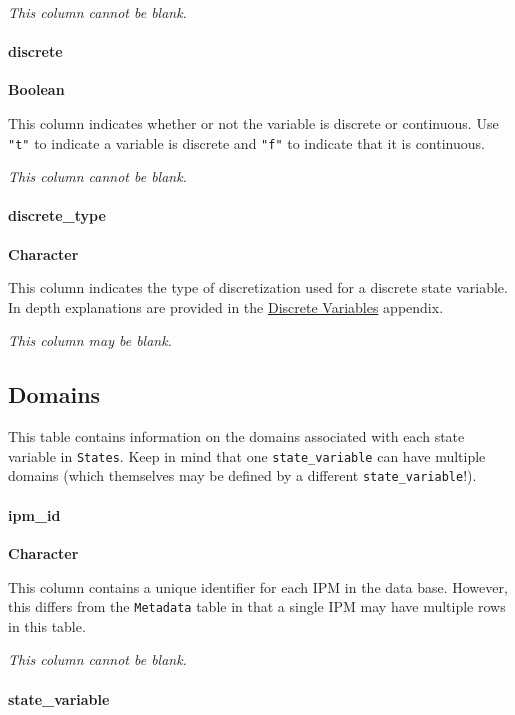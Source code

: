 \documentclass[]{article}
\let\oldparagraph\paragraph
\renewcommand{\paragraph}[1]{\oldparagraph{#1}\mbox{}}
\begin{document}
\emph{This column cannot be blank.}

\paragraph{discrete}\label{discrete}

\textbf{Boolean}

This column indicates whether or not the variable is discrete or
continuous. Use \texttt{"t"} to indicate a variable is discrete and
\texttt{"f"} to indicate that it is continuous.

\emph{This column cannot be blank.}

\paragraph{discrete\_type}\label{discrete_type}

\textbf{Character}

This column indicates the type of discretization used for a discrete
state variable. In depth explanations are provided in the
\protect\hyperlink{discrete-vars}{Discrete Variables} appendix.

\emph{This column may be blank.}

\subsection{Domains}\label{domains}

This table contains information on the domains associated with each
state variable in \texttt{States}. Keep in mind that one
\texttt{state\_variable} can have multiple domains (which themselves may
be defined by a different \texttt{state\_variable}!).

\paragraph{ipm\_id}\label{ipm_id-2}

\textbf{Character}

This column contains a unique identifier for each IPM in the data base.
However, this differs from the \texttt{Metadata} table in that a single
IPM may have multiple rows in this table.

\emph{This column cannot be blank.}

\paragraph{state\_variable}\label{state_variable-1}
\end{document}
